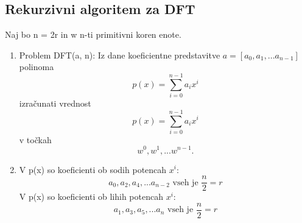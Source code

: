 \documentclass[a4paper,10pt]{article}
\begin{document}
\subsection{Rekurzivni algoritem za DFT}
Naj bo n = 2r in w n-ti primitivni koren enote.

\begin{enumerate}
\item Problem DFT(a, n):
Iz dane koeficientne predstavitve $a = [a_0, a_1,... a_{n-1}]$ polinoma 
$$
p(x) = \sum_{i=0}^{n-1} a_ix^i
$$
 izra\v cunati vrednost 
$$p(x) = \sum_{i=0}^{n-1}a_{i}x^{i}$$
 v to\v ckah 
$$w^0, w^1,... w^{n-1}.$$
\item V p(x) so koeficienti ob sodih potencah $x^i$:
$$a_0, a_2, a_4,... a_{n-2} \mbox{ vseh je } \frac{n}{2} = r$$
V p(x) so koeficienti ob lihih potencah $x^i$:
$$a_1, a_3, a_5,... a_{n} \mbox{ vseh je } \frac{n}{2} = r$$


\end{enumerate}
\end{document}

